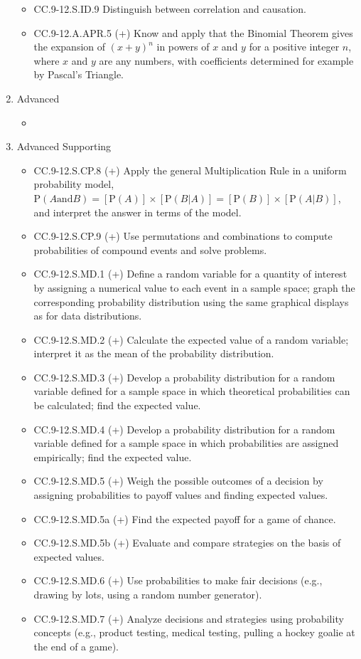 \documentclass{article}
\begin{document}
\begin{enumerate}
\begin{itemize}
		\item CC.9-12.S.ID.9  Distinguish between correlation and causation.
		\item CC.9-12.A.APR.5 (+) Know and apply that the Binomial Theorem gives the expansion of $(x + y)^n$ in powers of $x$ and $y$ for a positive integer $n$, where $x$ and $y$ are any numbers, with coefficients determined for example by Pascal’s Triangle. 
	\end{itemize}
	\item Advanced
	\begin{itemize}
		\item
	\end{itemize}
	\item Advanced Supporting
	\begin{itemize}
		\item CC.9-12.S.CP.8 (+)  Apply the general Multiplication Rule in a uniform probability model, $\textrm{P}(A \textrm{and} B) = [\textrm{P}(A)]\times[\textrm{P}(B|A)] =[\textrm{P}(B)]\times[\textrm{P}(A|B)]$, and interpret the answer in terms of the model.
		\item CC.9-12.S.CP.9 (+) Use permutations and combinations to compute probabilities of compound events and solve problems.
		\item CC.9-12.S.MD.1 (+) Define a random variable for a quantity of interest by assigning a numerical value to each event in a sample space; graph the corresponding probability distribution using the same graphical displays as for data distributions.
		\item CC.9-12.S.MD.2 (+) Calculate the expected value of a random variable; interpret it as the mean of the probability distribution.
		\item CC.9-12.S.MD.3 (+) Develop a probability distribution for a random variable defined for a sample space in which theoretical probabilities can be calculated; find the expected value. 
		\item CC.9-12.S.MD.4 (+)  Develop a probability distribution for a random variable defined for a sample space in which probabilities are assigned empirically; find the expected value. 
		\item CC.9-12.S.MD.5 (+)  Weigh the possible outcomes of a decision by assigning probabilities to payoff values and finding expected values.
		\item CC.9-12.S.MD.5a (+) Find the expected payoff for a game of chance. 
		\item CC.9-12.S.MD.5b (+)  Evaluate and compare strategies on the basis of expected values. 
		\item CC.9-12.S.MD.6 (+)  Use probabilities to make fair decisions (e.g., drawing by lots, using a random number generator).
		\item CC.9-12.S.MD.7 (+)  Analyze decisions and strategies using probability concepts (e.g., product testing, medical testing, pulling a hockey goalie at the end of a game).
	\end{itemize}
\end{enumerate}
\newpage
\end{document}
